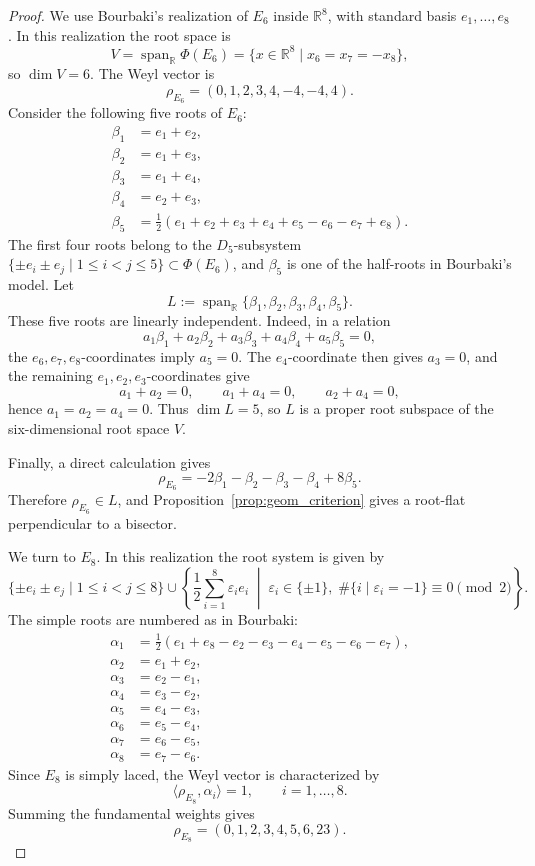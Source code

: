 \documentclass[10pt,a4paper]{amsart}
\DeclareMathOperator{\Span}{span}
\begin{document}
	\begin{proof}
		We use Bourbaki's realization of \(E_6\) inside \(\mathbb R^8\), with standard basis \(e_1,\ldots,e_8\).  In this realization the root space is
		\[
		V=\Span_{\mathbb R}\Phi(E_6)
		=
		\{x\in\mathbb R^8 \mid x_6=x_7=-x_8\},
		\]
		so \(\dim V=6\).  The Weyl vector is
		\[
		\rho_{E_6}=(0,1,2,3,4,-4,-4,4).
		\]
		Consider the following five roots of \(E_6\):
		\[
		\begin{aligned}
			\beta_1&=e_1+e_2,\\
			\beta_2&=e_1+e_3,\\
			\beta_3&=e_1+e_4,\\
			\beta_4&=e_2+e_3,\\
			\beta_5&=\frac12(e_1+e_2+e_3+e_4+e_5-e_6-e_7+e_8).
		\end{aligned}
		\]
		The first four roots belong to the \(D_5\)-subsystem \(\{\pm e_i\pm e_j\mid 1\le i<j\le5\}\subset\Phi(E_6)\), and \(\beta_5\) is one of the half-roots in Bourbaki's model.  Let
		\[
		L:=\Span_{\mathbb R}\{\beta_1,\beta_2,\beta_3,\beta_4,\beta_5\}.
		\]
		These five roots are linearly independent.  Indeed, in a relation
		\[
		a_1\beta_1+a_2\beta_2+a_3\beta_3+a_4\beta_4+a_5\beta_5=0,
		\]
		the \(e_6,e_7,e_8\)-coordinates imply \(a_5=0\).  The \(e_4\)-coordinate then gives \(a_3=0\), and the remaining \(e_1,e_2,e_3\)-coordinates give
		\[
		a_1+a_2=0,
		\qquad
		a_1+a_4=0,
		\qquad
		a_2+a_4=0,
		\]
		hence \(a_1=a_2=a_4=0\).  Thus \(\dim L=5\), so \(L\) is a proper root subspace of the six-dimensional root space \(V\).
		
		Finally, a direct calculation gives
		\[
		\rho_{E_6}
		=
		-2\beta_1-\beta_2-\beta_3-\beta_4+8\beta_5.
		\]
		Therefore \(\rho_{E_6}\in L\), and Proposition~\ref{prop:geom_criterion} gives a root-flat perpendicular to a bisector.
		
		
		We turn to $E_8$. In this realization the root system is given by
		\[
		\{\pm e_i\pm e_j\mid 1\le i<j\le 8\}
		\cup
		\left\{
		\frac12\sum_{i=1}^8 \varepsilon_i e_i
		\;\middle|\;
		\varepsilon_i\in\{\pm1\},\;
		\#\{i\mid \varepsilon_i=-1\}\equiv 0 \pmod 2
		\right\}.
		\]
		The simple roots are numbered as in Bourbaki:
		\[
		\begin{aligned}
			\alpha_1
			&=
			\frac12(e_1+e_8-e_2-e_3-e_4-e_5-e_6-e_7),\\
			\alpha_2&=e_1+e_2,\\
			\alpha_3&=e_2-e_1,\\
			\alpha_4&=e_3-e_2,\\
			\alpha_5&=e_4-e_3,\\
			\alpha_6&=e_5-e_4,\\
			\alpha_7&=e_6-e_5,\\
			\alpha_8&=e_7-e_6.
		\end{aligned}
		\]
		Since \(E_8\) is simply laced, the Weyl vector is characterized by
		\[
		\langle \rho_{E_8},\alpha_i\rangle=1,
		\qquad i=1,\ldots,8.
		\]
		Summing the fundamental weights gives
		\[
		\rho_{E_8}=(0,1,2,3,4,5,6,23).
		\]
		

\end{proof}
\end{document}

